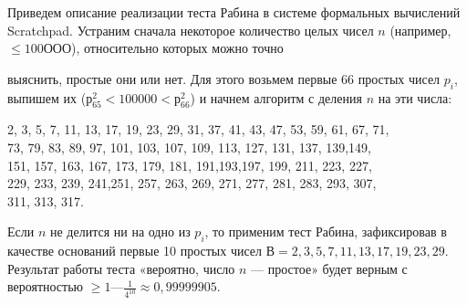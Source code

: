 \documentclass{mai_book}
\begin{document}
  	Приведем описание реализации теста Рабина в системе формальных 	вычислений Scratchpad. Устраним сначала некоторое количество целых чисел $n$ (например,$\leqslant 100 ООО$), относительно которых можно точно
  	
  	\pagebreak
  	\noindent
  	выяснить, простые они или нет. Для этого возьмем первые 66 простых  	чисел $p_i$, выпишем их ($р^{2}_{65}< 100 000 < р^{2}_{66}$) и начнем алгоритм с деления 	$n$ на эти числа:
  	\begin{center}
  		
  		2, 3, 5, 7, 11, 13, 17, 19, 23, 29, 31, 37, 41, 43, 47, 53, 59, 61, 67, 71, \\
  		73, 79, 83, 89, 97, 101, 103, 107, 109, 113, 127, 131, 137, 139,149, \\  		
  		151, 157, 163, 167, 173, 179, 181, 191,193,197, 199, 211, 223, 227, \\ 229, 233, 239, 241,251, 257, 263, 269, 271, 277, 281, 283, 293, 307, \\	311, 313, 317.
  	\end{center}	
  
  	Если $n$ не делится ни на одно из $p_i$, то применим тест Рабина, зафиксировав в качестве оснований первые 10 простых чисел $В = { 2, 3, 5, 7, 11, 13, 17, 19, 23, 29 }$. Результат работы теста «вероятно, число $n$ — простое» будет верным с вероятностью $ \geqslant 1 — \frac{1}{4^{10}} \approx	0,99999905.$
 
\end{document}
